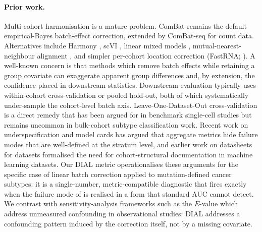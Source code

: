 \documentclass[11pt,a4paper]{article}
\begin{document}
\paragraph{Prior work.} Multi-cohort harmonisation is a mature
problem. ComBat \citep{johnson2007combat,leek2010sva} remains the
default empirical-Bayes batch-effect correction, extended by
ComBat-seq \citep{zhang2020combatseq} for count data. Alternatives
include Harmony \citep{korsunsky2019harmony}, scVI
\citep{lopez2018scvi}, linear mixed models
\citep{sul2018population}, mutual-nearest-neighbour alignment
\citep{haghverdi2018mnn}, and simpler per-cohort location correction
(FastRNA; \citep{lee2022fastrna}). A well-known concern
\citep{nygaard2016batch} is that methods which remove batch effects
while retaining a group covariate can exaggerate apparent group
differences and, by extension, the confidence placed in downstream
statistics. Downstream evaluation typically uses within-cohort
cross-validation or pooled hold-out, both of which systematically
under-sample the cohort-level batch axis. Leave-One-Dataset-Out
cross-validation is a direct remedy that has been argued for in
benchmark single-cell studies \citep{tran2020benchmark} but remains
uncommon in bulk-cohort subtype classification work. Recent work on
underspecification and model cards
\citep{damour2020underspecification,mitchell2019modelcards} has
argued that aggregate metrics hide failure modes that are
well-defined at the stratum level, and earlier work on datasheets
for datasets \citep{gebru2021datasheets} formalised the need for
cohort-structural documentation in machine learning datasets. Our
DIAL metric operationalises these arguments for the specific case of
linear batch correction applied to mutation-defined cancer subtypes:
it is a single-number, metric-compatible diagnostic that fires
exactly when the failure mode of
\citep{nygaard2016batch} is realised in a form that standard AUC
cannot detect. We contrast with sensitivity-analysis frameworks such
as the $E$-value \citep{vanderweele2017evalue} which address
unmeasured confounding in observational studies: DIAL addresses a
confounding pattern induced by the correction itself, not by a
missing covariate.
\end{document}
